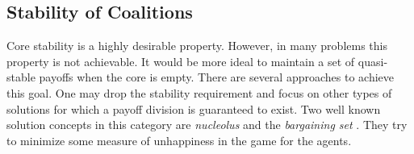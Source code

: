 




        \subsection{Stability of Coalitions}

        Core stability is a highly desirable property. However, in many problems this property is not achievable. It would be more ideal to maintain a set of quasi-stable payoffs when the core is empty. There are several approaches to achieve this goal. One may drop the stability requirement and focus on other types of solutions for which a payoff division is guaranteed to exist. Two well known solution concepts in this category are \emph{nucleolus} \cite{schmeidler_nucleolus_1969} and the \emph{bargaining set} \cite{Davis67existenceof}. They try to minimize some measure of unhappiness in the game for the agents.

